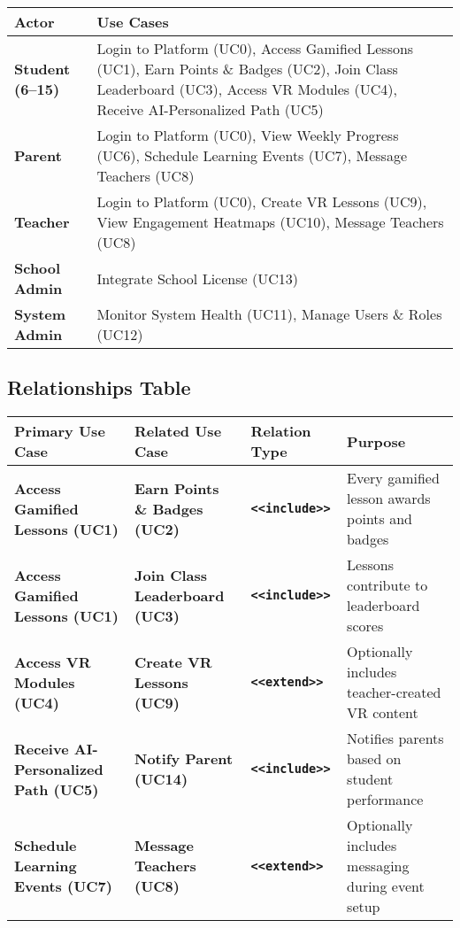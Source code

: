 \documentclass[12pt,a4paper]{article}
\renewcommand{\arraystretch}{1.4}
\begin{document}
\begin{tabularx}{\textwidth}{>{\bfseries}l X}
\toprule
Actor & Use Cases \\
\midrule
Student (6–15) & 
Login to Platform (UC0), Access Gamified Lessons (UC1), Earn Points \& Badges (UC2), Join Class Leaderboard (UC3), Access VR Modules (UC4), Receive AI-Personalized Path (UC5) \\

Parent & 
Login to Platform (UC0), View Weekly Progress (UC6), Schedule Learning Events (UC7), Message Teachers (UC8) \\

Teacher & 
Login to Platform (UC0), Create VR Lessons (UC9), View Engagement Heatmaps (UC10), Message Teachers (UC8) \\

School Admin & 
Integrate School License (UC13) \\

System Admin & 
Monitor System Health (UC11), Manage Users \& Roles (UC12) \\
\bottomrule
\end{tabularx}
\subsection*{Relationships Table}

\scriptsize %
\setlength{\tabcolsep}{2pt} %
\renewcommand{\arraystretch}{1.05} %


\begin{tabularx}{\textwidth}{>{\hsize=0.9\hsize\bfseries}X >{\hsize=0.9\hsize\bfseries}X >{\hsize=0.6\hsize\bfseries}X X}
\toprule
Primary Use Case & Related Use Case & Relation Type & Purpose \\
\midrule
Access Gamified Lessons (UC1) & Earn Points \& Badges (UC2) & \texttt{<<include>>} & Every gamified lesson awards points and badges \\
Access Gamified Lessons (UC1) & Join Class Leaderboard (UC3) & \texttt{<<include>>} & Lessons contribute to leaderboard scores \\
Access VR Modules (UC4) & Create VR Lessons (UC9) & \texttt{<<extend>>} & Optionally includes teacher-created VR content \\
Receive AI-Personalized Path (UC5) & Notify Parent (UC14) & \texttt{<<include>>} & Notifies parents based on student performance \\
Schedule Learning Events (UC7) & Message Teachers (UC8) & \texttt{<<extend>>} & Optionally includes messaging during event setup \\
\bottomrule
\end{tabularx}
\normalsize
\end{document}
